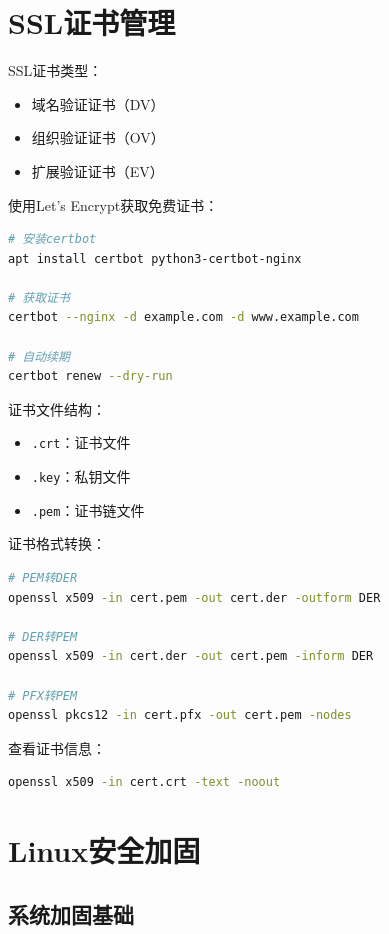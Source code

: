 \documentclass[12pt,UTF8]{ctexbook}
\begin{document}
\section{SSL证书管理}
\label{sec:ssl-cert}

SSL证书类型：
\begin{itemize}
    \item 域名验证证书（DV）
    \item 组织验证证书（OV）
    \item 扩展验证证书（EV）
\end{itemize}

使用Let's Encrypt获取免费证书：
\begin{lstlisting}[language=bash]
# 安装certbot
apt install certbot python3-certbot-nginx

# 获取证书
certbot --nginx -d example.com -d www.example.com

# 自动续期
certbot renew --dry-run
\end{lstlisting}

证书文件结构：
\begin{itemize}
    \item \texttt{.crt}：证书文件
    \item \texttt{.key}：私钥文件
    \item \texttt{.pem}：证书链文件
\end{itemize}

证书格式转换：
\begin{lstlisting}[language=bash]
# PEM转DER
openssl x509 -in cert.pem -out cert.der -outform DER

# DER转PEM
openssl x509 -in cert.der -out cert.pem -inform DER

# PFX转PEM
openssl pkcs12 -in cert.pfx -out cert.pem -nodes
\end{lstlisting}

查看证书信息：
\begin{lstlisting}[language=bash]
openssl x509 -in cert.crt -text -noout
\end{lstlisting}

\section{Linux安全加固}
\label{sec:linux-hardening}

\subsection*{系统加固基础}
\end{document}
